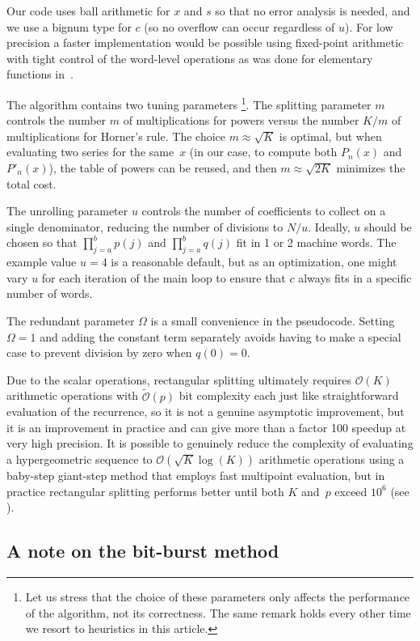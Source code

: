 \documentclass[nohypdvips,review]{siamart0216}
\newcommand{\OO}{\mathcal{O}}
\newcommand{\OOtilde}{\widetilde{\mathcal{O}}}
\begin{document}
Our code uses ball arithmetic for $x$ and $s$
so that no error analysis is needed, and we use a bignum type for $c$ (so
no overflow can occur regardless of $u$).
For low precision a faster implementation
would be possible using fixed-point arithmetic with tight
control of the word-level operations
as was done for elementary functions in~\cite{Johansson2015elementary}.

The algorithm contains two tuning parameters%
\footnote{Let us stress that the choice of these parameters only affects
the performance of the algorithm, not its correctness.
The same remark holds every other time we resort to heuristics in this
article.}.
The splitting parameter $m$ controls the
number $m$ of multiplications for powers versus the number $K / m$ of
multiplications for Horner's rule.
The choice $m \approx \sqrt K$ is optimal,
but when evaluating two series for the same~$x$
(in our case, to compute both $P_n(x)$ and $P'_n(x)$),
the table of powers can be reused,
and then $m \approx \sqrt{2K}$ minimizes the total cost.

The unrolling parameter $u$ controls the number of coefficients
to collect on a single denominator, reducing the
number of divisions to $N / u$.
Ideally, $u$ should be chosen
so that $\prod_{j=a}^b p(j)$
and $\prod_{j=a}^b q(j)$ fit in 1 or 2 machine words.
The example value $u = 4$ is a reasonable
default, but as an optimization, one might vary $u$
for each iteration of the main loop
to ensure that $c$ always fits in a specific number of words.

The redundant parameter $\Omega$ is a small convenience in the pseudocode.
Setting $\Omega = 1$ and adding the constant term separately
avoids having to make a special case to prevent division by zero
when $q(0) = 0$.

Due to the scalar operations, rectangular splitting ultimately
requires $\OO(K)$ arithmetic operations with $\OOtilde(p)$ bit complexity
each
just like straightforward evaluation of the recurrence, so it is
not a genuine asymptotic improvement, but
it is an improvement in practice and
can give more than a factor 100 speedup at very high precision.
It is possible to genuinely reduce the complexity of evaluating
a hypergeometric sequence to $\OO(\sqrt{K} \log(K))$ arithmetic
operations using a baby-step giant-step method
that employs fast multipoint evaluation,
but in practice rectangular splitting
performs better until both $K$ and~$p$
exceed $10^6$ (see \cite{Johansson2014rectangular}).

\subsection{A note on the bit-burst method}
\end{document}
